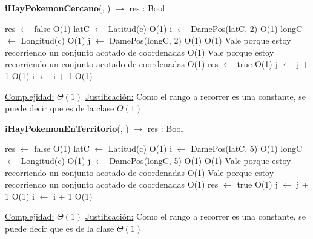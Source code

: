  \begin{algorithm}[H]{\textbf{iHayPokemonCercano}(, ) $\to$ res : Bool} 
	\begin{algorithmic}
		\State res $\gets$ false	\Comment O(1) 
		\State latC $\gets$ Latitud(c)	\Comment O(1)
		\State i $\gets$ DamePos(latC, 2) \Comment O(1)		
		\State longC $\gets$ Longitud(c)	\Comment O(1)
		\State j $\gets$ DamePos(longC, 2) \Comment O(1)
			\Comment O(1) {Vale porque estoy recorriendo un conjunto acotado de coordenadas}
				\Comment O(1) {Vale porque estoy recorriendo un conjunto acotado de coordenadas}
					\Comment O(1)
					\State res $\gets$ true	\Comment O(1) 
				\EndIf
				\State j $\gets$ j + 1	\Comment O(1)
			\EndWhile
			\State i $\gets$ i + 1	\Comment O(1)
		\EndWhile
	
		\medskip
		\Statex \underline{Complejidad:} $\Theta(1)$
		\Statex \underline{Justificación:} Como el rango a recorrer es una constante, se puede decir que es de la clase $\Theta(1)$
     \end{algorithmic}
 \end{algorithm}
 
 \begin{algorithm}[H]{\textbf{iHayPokemonEnTerritorio}(, ) $\to$ res : Bool} 
	\begin{algorithmic}
		\State res $\gets$ false	\Comment O(1) 
		\State latC $\gets$ Latitud(c)	\Comment O(1)
		\State i $\gets$ DamePos(latC, 5) \Comment O(1)		
		\State longC $\gets$ Longitud(c)	\Comment O(1)
		\State j $\gets$ DamePos(longC, 5) \Comment O(1)
			\Comment O(1) {Vale porque estoy recorriendo un conjunto acotado de coordenadas}
				\Comment O(1) {Vale porque estoy recorriendo un conjunto acotado de coordenadas}
					\Comment O(1)
					\State res $\gets$ true	\Comment O(1) 
				\EndIf
				\State j $\gets$ j + 1	\Comment O(1)
			\EndWhile
			\State i $\gets$ i + 1	\Comment O(1)
		\EndWhile
	
		\medskip
		\Statex \underline{Complejidad:} $\Theta(1)$
		\Statex \underline{Justificación:} Como el rango a recorrer es una constante, se puede decir que es de la clase $\Theta(1)$
     \end{algorithmic}
 \end{algorithm}


